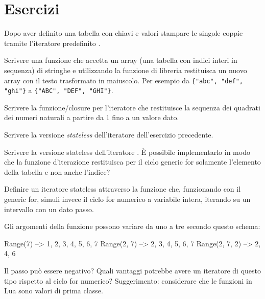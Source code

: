 \section{Esercizi}

\begin{Exercise}[label=iter-01]
Dopo aver definito una tabella con chiavi e valori stampare le singole coppie
tramite l'iteratore predefinito .
\end{Exercise}

\begin{Exercise}[label=iter-02]
Scrivere una funzione che accetta un array (una tabella con indici interi in
sequenza) di stringhe e utilizzando la funzione di libreria 
restituisca un nuovo array con il testo trasformato in maiuscolo. Per esempio da
\verb|{"abc", "def", "ghi"}| a \verb|{"ABC", "DEF", "GHI"}|.
\end{Exercise}

\begin{Exercise}[label=iter-03]
Scrivere la funzione/closure per l'iteratore che restituisce la sequenza dei
quadrati dei numeri naturali a partire da 1 fino a un valore dato.
\end{Exercise}

\begin{Exercise}[label=iter-04]
Scrivere la versione \emph{stateless} dell'iteratore dell'esercizio precedente.
\end{Exercise}

\begin{Exercise}[label=iter-05]
Scrivere la versione stateless dell'iteratore . È possibile
implementarlo in modo che la funzione d'iterazione restituisca per il ciclo
generic for solamente l'elemento della tabella e non anche l'indice?
\end{Exercise}

\begin{Exercise}[label=iter-06]
Definire un iteratore stateless attraverso la funzione  che,
funzionando con il generic for, simuli invece il ciclo for numerico a variabile
intera, iterando su un intervallo con un dato passo.

Gli argomenti della funzione possono variare da uno a tre secondo questo schema:
\begin{lines}
Range(7)       --> 1, 2, 3, 4, 5, 6, 7
Range(2, 7)    --> 2, 3, 4, 5, 6, 7
Range(2, 7, 2) --> 2, 4, 6
\end{lines}

Il passo può essere negativo? Quali vantaggi potrebbe avere un iteratore di
questo tipo rispetto al ciclo for numerico? Suggerimento: considerare che le
funzioni in Lua sono valori di prima classe.
\end{Exercise}

